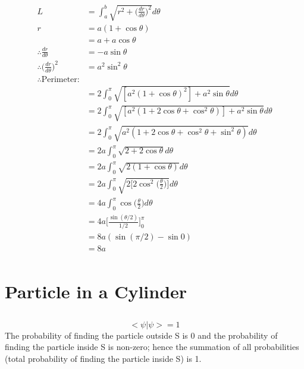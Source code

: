 \documentclass{article}
\begin{document}
\subsection{}%
\large{
\begin{align*}
    L &= \int_a^b\sqrt{r^2+\Bigg(\frac{dr}{d\theta}\Bigg)^2}d\theta\\
    r &= a(1+\cos\theta)\\
    &= a + a\cos\theta\\
    \therefore \frac{dr}{d\theta} &= -a\sin\theta\\
    \therefore \Bigg(\frac{dr}{d\theta}\Bigg)^2&=a^2\sin^2\theta\\
    \therefore \text{Perimeter:}\\
    &= 2\int_0^\pi \sqrt{[a^2(1+\cos\theta)^2]+a^2\sin\theta}d\theta\\
    &=2\int_0^\pi\sqrt{[a^2(1+2\cos\theta+\cos^2\theta)]+a^2\sin\theta}d\theta\\
    &= 2\int_0^\pi \sqrt{a^2(1+2\cos\theta+\cos^2\theta+\sin^2\theta)}d\theta\\
    &=2a\int_0^\pi\sqrt{2+2\cos\theta}d\theta\\ &= 2a\int_0^\pi\sqrt{2(1+\cos\theta)}d\theta\\
    &=2a\int_0^\pi\sqrt{2\Bigg[2\cos^2\Bigg(\frac{\theta}{2}\Bigg)\Bigg]}d\theta\\
    &=4a\int_0^\pi \cos\Bigg(\frac{\theta}{2}\Bigg)d\theta\\
    &=4a\Bigg[\frac{\sin(\theta/2)}{1/2}\Bigg]_0^\pi\\ &= 8a(\sin(\pi/2)-\sin0)\\
    &=8a\\
\end{align*}
}


\newpage
\section{Particle in a Cylinder}
\subsection{}%
\large{
$$<\psi|\psi> = 1 $$
The probability of finding the particle outside S is 0 and the probability of finding the particle inside S is non-zero; hence the summation of all probabilities (total probability of finding the particle inside S) is 1.
}

\vspace{2cm}
\end{document}
